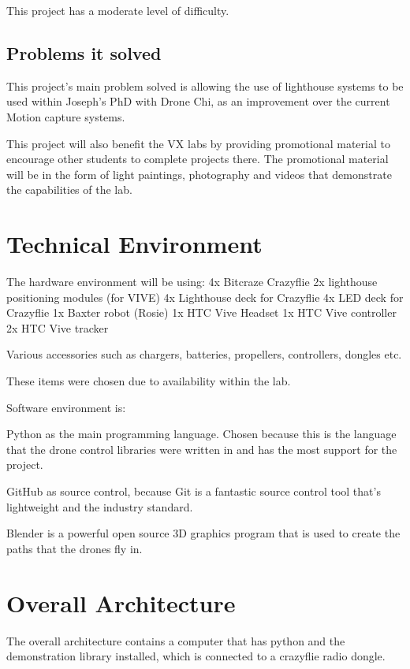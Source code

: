 \documentclass{article}
\begin{document}
  This project has a moderate level of difficulty.

  \subsection{Problems it solved}
   
  This project's main problem solved is allowing the use of lighthouse systems
  to be used within Joseph's PhD with Drone Chi, as an improvement over the current
  Motion capture systems.

  This project will also benefit the VX labs by providing promotional material to encourage other
  students to complete projects there. The promotional material will be in the form of light
  paintings, photography and videos that demonstrate the capabilities of the lab.

  \section {Technical Environment}

  The hardware environment will be using:
  4x Bitcraze Crazyflie
  2x lighthouse positioning modules (for VIVE)
  4x Lighthouse deck for Crazyflie 
  4x LED deck for Crazyflie 
  1x Baxter robot (Rosie)
  1x HTC Vive Headset
  1x HTC Vive controller
  2x HTC Vive tracker

  Various accessories such as chargers, batteries, propellers, controllers, dongles etc.

  These items were chosen due to availability within the lab.

  Software environment is:

  Python as the main programming language. Chosen because this is the language
  that the drone control libraries were written in and has the most support
  for the project.
   
  GitHub as source control, because Git is a fantastic source control tool that's
  lightweight and the industry standard.

  Blender is a powerful open source 3D graphics program that is used to create
  the paths that the drones fly in.

  \section {Overall Architecture}
  The overall architecture contains a computer that has python and the demonstration
  library installed, which is connected to a crazyflie radio dongle.
\end{document}
